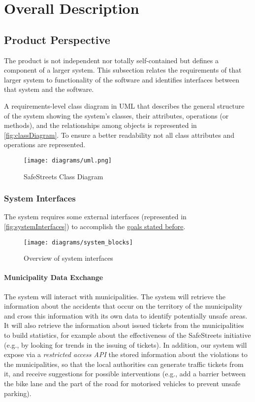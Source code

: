 \section{Overall Description}

\subsection{Product Perspective}
	
	The product is not independent nor totally self-contained but defines a component of a larger system. This subsection relates the requirements of that larger system to functionality of the software and identifies interfaces between that system and the software.
	
	A requirements-level class diagram in UML that describes the general structure of the system showing the system's classes, their attributes, operations (or methods), and the relationships among objects is represented in \autoref{fig:classDiagram}. To ensure a better readability not all class attributes and operations are represented. \newline 
		
	\begin{figure}[h]
			\centering
			\texttt{[image: diagrams/uml.png]}
			\caption{ 
				\label{fig:classDiagram} 
				SafeStreets Class Diagram
			}
		\end{figure}
		
	\subsubsection{System Interfaces}
	\label{sec:systemInterfaces}
		The system requires some external interfaces (represented in \autoref{fig:systemInterfaces}) to accomplish the \hyperref[sec:goals]{goals stated before}. \newline 
		\begin{figure}[h]
			\centering
			\texttt{[image: diagrams/system\_blocks]}
			\caption{
				\label{fig:systemInterfaces} 
				Overview of system interfaces
			}
		\end{figure} 
\clearpage			
\paragraph{Municipality Data Exchange} The system will interact with municipalities. The system will retrieve the information about the accidents that occur on the territory of the municipality and cross this information with its own data to identify potentially unsafe areas. It will also retrieve the information about issued tickets from the municipalities to build statistics, for example about the effectiveness of the SafeStreets initiative (e.g., by looking for trends in the issuing of tickets). In addition, our system will expose via a \emph{restricted access API} the stored information about the violations to the municipalities, so that the local authorities can generate traffic tickets from it, and receive suggestions for possible interventions (e.g., add a barrier between the bike lane and the part of the road for motorised vehicles to prevent unsafe parking). \cite{Assignments}


